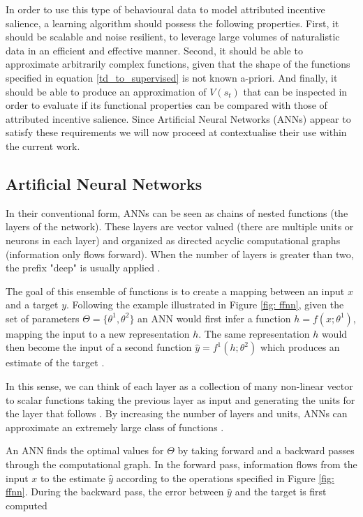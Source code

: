 In order to use this type of behavioural data to model attributed incentive salience, a learning algorithm should possess the following properties. First, it should be scalable and noise resilient, to leverage large volumes of naturalistic data in an efficient and effective manner. Second, it should be able to approximate arbitrarily complex functions, given that the shape of the functions specified in equation \ref{td_to_supervised} is not known a-priori. And finally, it should be able to produce an approximation of $V(s_{t})$ that can be inspected in order to evaluate if its functional properties can be compared with those of attributed incentive salience. Since Artificial Neural Networks (ANNs) appear to satisfy these requirements we will now proceed at contextualise their use within the current work.

\subsection{Artificial Neural Networks}
\label{artificial_neural_networks}
In their conventional form, ANNs can be seen as chains of nested functions (the layers of the network). These layers are vector valued (there are multiple units or neurons in each layer) and organized as directed acyclic computational graphs (information only flows forward). When the number of layers is greater than two, the prefix "deep" is usually applied \cite{bengio2017deep}. 

The goal of this ensemble of functions is to create a mapping between an input $x$ and a target $y$. Following the example illustrated in Figure \ref{fig: ffnn}, given the set of parameters $\Theta = \{\theta^1, \theta^2 \}$ an ANN would first infer a function $h = f(x;\theta^{1})$, mapping the input to a new representation $h$. The same representation $h$ would then become the input of a second function $\widehat{y} = f^{1}(h;\theta^{2})$ which produces an estimate of the target \cite{bengio2017deep}. 

In this sense, we can think of each layer as a collection of many non-linear vector to scalar functions taking the previous layer as input and generating the units for the layer that follows \cite{bengio2017deep}. By increasing the number of layers and units, ANNs can approximate an extremely large class of functions \cite{rumelhart1986learning}.



An ANN finds the optimal values for $\Theta$ by taking forward and a backward passes through the computational graph. In the forward pass, information flows from the input $x$ to the estimate $\widehat{y}$ according to the operations specified in Figure \ref{fig: ffnn}. During the backward pass, the error between $\widehat{y}$ and the target is first computed

